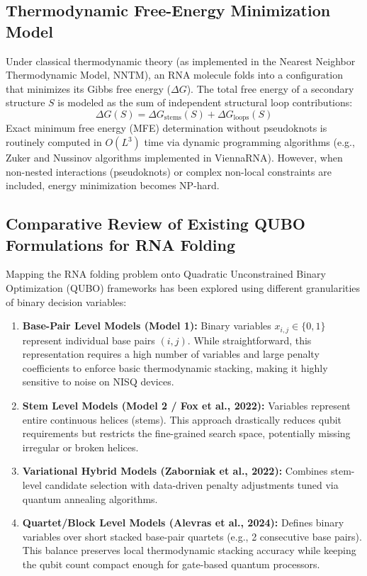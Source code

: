 \documentclass[11pt,a4paper]{article}
\begin{document}
	\subsection{Thermodynamic Free-Energy Minimization Model}
	
	Under classical thermodynamic theory (as implemented in the Nearest Neighbor Thermodynamic Model, NNTM), an RNA molecule folds into a configuration that minimizes its Gibbs free energy ($\Delta G$). The total free energy of a secondary structure $S$ is modeled as the sum of independent structural loop contributions:
	\begin{equation}
		\Delta G(S) = \Delta G_{\text{stems}}(S) + \Delta G_{\text{loops}}(S)
	\end{equation}
	Exact minimum free energy (MFE) determination without pseudoknots is routinely computed in $O(L^3)$ time via dynamic programming algorithms (e.g., Zuker and Nussinov algorithms implemented in ViennaRNA). However, when non-nested interactions (pseudoknots) or complex non-local constraints are included, energy minimization becomes NP-hard.
	
	\subsection{Comparative Review of Existing QUBO Formulations for RNA Folding}
	
	Mapping the RNA folding problem onto Quadratic Unconstrained Binary Optimization (QUBO) frameworks has been explored using different granularities of binary decision variables:
	
	\begin{enumerate}[leftmargin=1.2cm]
		\item \textbf{Base-Pair Level Models (Model 1):} Binary variables $x_{i,j} \in \{0, 1\}$ represent individual base pairs $(i, j)$. While straightforward, this representation requires a high number of variables and large penalty coefficients to enforce basic thermodynamic stacking, making it highly sensitive to noise on NISQ devices.
		\item \textbf{Stem Level Models (Model 2 / Fox et al., 2022):} Variables represent entire continuous helices (stems). This approach drastically reduces qubit requirements but restricts the fine-grained search space, potentially missing irregular or broken helices.
		\item \textbf{Variational Hybrid Models (Zaborniak et al., 2022):} Combines stem-level candidate selection with data-driven penalty adjustments tuned via quantum annealing algorithms.
		\item \textbf{Quartet/Block Level Models (Alevras et al., 2024):} Defines binary variables over short stacked base-pair quartets (e.g., 2 consecutive base pairs). This balance preserves local thermodynamic stacking accuracy while keeping the qubit count compact enough for gate-based quantum processors.
	\end{enumerate}
	
\end{document}
